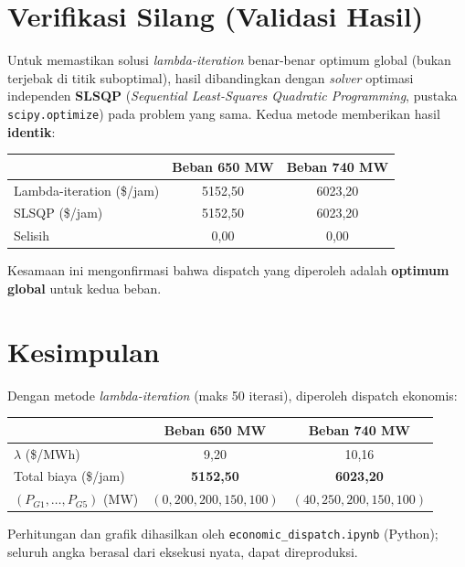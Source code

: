 \documentclass[11pt,a4paper]{article}
\begin{document}
\section{Verifikasi Silang (Validasi Hasil)}
Untuk memastikan solusi \emph{lambda-iteration} benar-benar optimum global (bukan
terjebak di titik suboptimal), hasil dibandingkan dengan \emph{solver} optimasi
independen \textbf{SLSQP} (\emph{Sequential Least-Squares Quadratic Programming},
pustaka \texttt{scipy.optimize}) pada problem yang sama. Kedua metode memberikan hasil
\textbf{identik}:
\begin{center}
\begin{tabular}{lcc}
\toprule
 & Beban 650 MW & Beban 740 MW \\
\midrule
Lambda-iteration (\$/jam) & 5152{,}50 & 6023{,}20 \\
SLSQP (\$/jam)            & 5152{,}50 & 6023{,}20 \\
Selisih                   & 0{,}00 & 0{,}00 \\
\bottomrule
\end{tabular}
\end{center}
Kesamaan ini mengonfirmasi bahwa dispatch yang diperoleh adalah \textbf{optimum global}
untuk kedua beban.

\section{Kesimpulan}
Dengan metode \emph{lambda-iteration} (maks 50 iterasi), diperoleh dispatch ekonomis:
\begin{center}
\begin{tabular}{lcc}
\toprule
 & Beban 650 MW & Beban 740 MW \\
\midrule
$\lambda$ (\$/MWh) & 9{,}20 & 10{,}16 \\
Total biaya (\$/jam) & \textbf{5152{,}50} & \textbf{6023{,}20} \\
$(P_{G1},\dots,P_{G5})$ (MW) & $(0,200,200,150,100)$ & $(40,250,200,150,100)$ \\
\bottomrule
\end{tabular}
\end{center}

Perhitungan dan grafik dihasilkan oleh \texttt{economic\_dispatch.ipynb} (Python);
seluruh angka berasal dari eksekusi nyata, dapat direproduksi.
\end{document}

